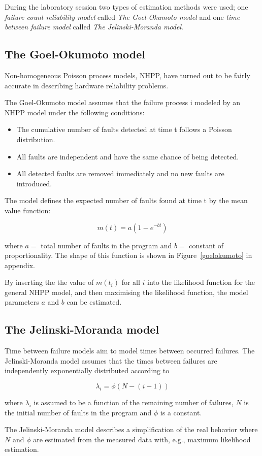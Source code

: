 During the laboratory session two types of estimation methods were used; one \textit{failure count reliability model} called \textit{The Goel-Okumoto model }and one \textit{time between failure model} called \textit{The Jelinski-Moranda model}. 

\subsection{The Goel-Okumoto model}
Non-homogeneous Poisson process models, NHPP, have turned out to be fairly accurate in describing hardware reliability problems. 

The Goel-Okumoto model assumes that the failure process i modeled by an NHPP model under the following conditions:
\begin{itemize}
\item	The cumulative number of faults detected at time t follows a Poisson distribution.
\item	All faults are independent and have the same chance of being detected.
\item 	All detected faults are removed immediately and no new faults are introduced.
\end{itemize}

\noindent The model defines the expected number of faults found at time t by the mean value function:

$$m(t) = a(1 - e^{-bt})$$

\noindent where $a=$ total number of faults in the program and $b=$ constant of proportionality. The shape of this function is shown in Figure~\ref{goelokumoto} in appendix.


\noindent By inserting the the value of $m(t_{i})$ for all $i$ into the likelihood function for the general NHPP model, and then maximising the likelihood function, the model parameters $a$ and $b$ can be estimated. 

\subsection{The Jelinski-Moranda model}
Time between failure models aim to model times between occurred failures. The Jelinski-Moranda model assumes that the times between failures are independently exponentially distributed according to 

$$\lambda_{i}=\phi(N-(i-1))$$

\noindent where $\lambda_{i}$ is assumed to be a function of the remaining number of failures, $N$ is the initial number of faults in the program and $\phi$ is a constant. 

The Jelinski-Moranda model describes a simplification of the real behavior where $N$ and $\phi$ are estimated from the measured data with, e.g., maximum likelihood estimation. 
